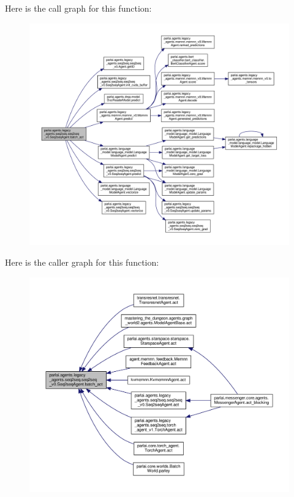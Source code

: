 Here is the call graph for this function\+:
\nopagebreak
\begin{figure}[H]
\begin{center}
\leavevmode
\includegraphics[width=350pt]{classparlai_1_1agents_1_1legacy__agents_1_1seq2seq_1_1seq2seq__v0_1_1Seq2seqAgent_a4ae534e440fd57603bc9b6e7c08b1c57_cgraph}
\end{center}
\end{figure}
Here is the caller graph for this function\+:
\nopagebreak
\begin{figure}[H]
\begin{center}
\leavevmode
\includegraphics[width=350pt]{classparlai_1_1agents_1_1legacy__agents_1_1seq2seq_1_1seq2seq__v0_1_1Seq2seqAgent_a4ae534e440fd57603bc9b6e7c08b1c57_icgraph}
\end{center}
\end{figure}
